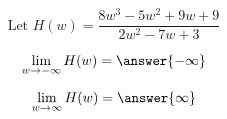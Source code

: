 \documentclass{ximera}
\author{Lee Wayand}
\begin{document}
\begin{exercise}


\begin{question}



\[
\text{Let }    H(w) = \frac{8 w^3 - 5 w^2 + 9 w + 9}{2 w^2 - 7w + 3}
\]



\[
\lim\limits_{w \to -\infty} H(w) = \answer{-\infty} 
\]


\[
\lim\limits_{w \to \infty} H(w) = \answer{\infty} 
\]


\end{question}










\end{exercise}
\end{document}
